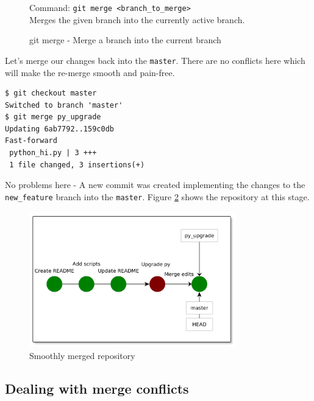 \documentclass[../main/git_course_main.tex]{subfiles}
\begin{document}
\begin{figure}[h!]
\begin{bluebox}
Command: \verb$git merge <branch_to_merge>$ \\

Merges the given branch into the currently active branch.
\end{bluebox}
\label{command:merge}
\caption{git merge - Merge a branch into the current branch}
\end{figure}

Let's merge our changes back into the \verb$master$. There are no conflicts here
which will make the re-merge smooth and pain-free.

\begin{codebox}
\begin{lstlisting}
$ git checkout master
Switched to branch 'master'
$ git merge py_upgrade
Updating 6ab7792..159c0db
Fast-forward
 python_hi.py | 3 +++
 1 file changed, 3 insertions(+)
\end{lstlisting}
\end{codebox}

No problems here - A new commit was created implementing the changes to the \verb$new_feature$ branch into the \verb$master$. Figure \ref{fig:smooth_merge} shows the repository at this stage.

\begin{figure}[h!]
	\centering
	\includegraphics[width=0.8\textwidth]{../visualizations/chapter4/44_smoothly_merged_branch.pdf}
	\caption{Smoothly merged repository}
	\label{fig:smooth_merge}
\end{figure}

\subsection{Dealing with merge conflicts}
\end{document}
